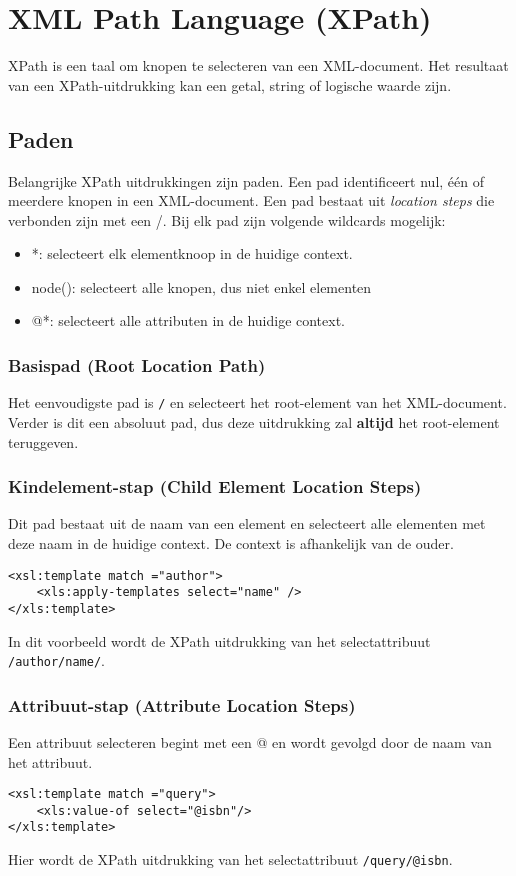\documentclass{report}
\begin{document}
	\chapter{XML Path Language (XPath)}
	XPath is een taal om knopen te selecteren van een XML-document. Het resultaat van een XPath-uitdrukking kan een getal, string of logische waarde zijn.
	\section{Paden}
	Belangrijke XPath uitdrukkingen zijn paden. Een pad identificeert nul, één of meerdere knopen in een XML-document. Een pad bestaat uit \textit{location steps} die verbonden zijn met een /. Bij elk pad zijn volgende wildcards mogelijk:
	\begin{itemize}
		\item *: selecteert elk elementknoop in de huidige context.
		\item node(): selecteert alle knopen, dus niet enkel elementen
		\item @*: selecteert alle attributen in de huidige context.
	\end{itemize}
	\subsection{Basispad (Root Location Path)}
	
	Het eenvoudigste pad is \texttt{/} en selecteert het root-element van het XML-document. Verder is dit een absoluut pad, dus deze uitdrukking zal \textbf{altijd} het root-element teruggeven.
	\subsection{Kindelement-stap (Child Element Location Steps)}
	Dit pad bestaat uit de naam van een element en selecteert alle elementen met deze naam in de huidige context. De context is afhankelijk van de ouder. 
	
	\begin{lstlisting}
<xsl:template match ="author">
	<xls:apply-templates select="name" />
</xls:template>
	\end{lstlisting}
	In dit voorbeeld wordt de XPath uitdrukking van het selectattribuut \texttt{/author/name/}.
	
	\subsection{Attribuut-stap (Attribute Location Steps)}
	Een attribuut selecteren begint met een @ en wordt gevolgd door de naam van het attribuut.	
	\begin{lstlisting}
<xsl:template match ="query">
	<xls:value-of select="@isbn"/>
</xls:template>
	\end{lstlisting}
	Hier wordt de XPath uitdrukking van het selectattribuut \texttt{/query/@isbn}.
\end{document}
